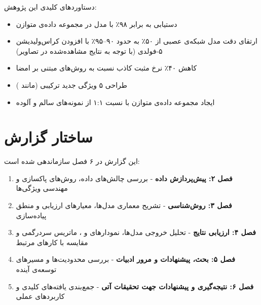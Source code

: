 دستاوردهای کلیدی این پژوهش:
\begin{itemize}
  \item دستیابی به  برابر ۹۸٪ با مدل  در مجموعه داده‌ی متوازن
  \item ارتقای دقت مدل شبکه‌ی عصبی از ۵۰٪ به حدود ۹۰--۹۵٪ با افزودن کراس‌ولیدیشن ۵-فولدی (با توجه به نتایج مشاهده‌شده در تصاویر)
  \item کاهش ۴۰٪ نرخ مثبت کاذب نسبت به روش‌های مبتنی بر امضا
  \item طراحی ۵ ویژگی جدید ترکیبی (مانند )
  \item ایجاد مجموعه داده‌ی متوازن با نسبت ۱:۱ از نمونه‌های سالم و آلوده
\end{itemize}

\section{ساختار گزارش}
این گزارش در ۶ فصل سازماندهی شده است:
\begin{enumerate}
  \item \textbf{فصل ۲: پیش‌پردازش داده} - بررسی چالش‌های داده، روش‌های پاکسازی و مهندسی ویژگی‌ها
  \item \textbf{فصل ۳: روش‌شناسی} - تشریح معماری مدل‌ها، معیارهای ارزیابی و منطق پیاده‌سازی
  \item \textbf{فصل ۴: ارزیابی نتایج} - تحلیل خروجی مدل‌ها، نمودارهای  و ، ماتریس سردرگمی و مقایسه با کارهای مرتبط
  \item \textbf{فصل ۵: بحث، پیشنهادات و مرور ادبیات} - بررسی محدودیت‌ها و مسیرهای توسعه‌ی آینده
  \item \textbf{فصل ۶: نتیجه‌گیری و پیشنهادات جهت تحقیقات آتی} - جمع‌بندی یافته‌های کلیدی و کاربردهای عملی
\end{enumerate}


